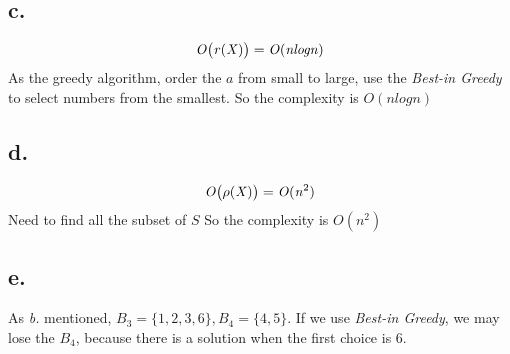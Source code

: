 \documentclass{article}
\begin{document}
{    \subsection*{c.}{
        \[\mathit{O\big{(}r(X)\big{)}=O(n log n)}\]
        As the greedy algorithm, order the \(\mathit{a}\) from small to large, use the \textit{Best-in Greedy} to select numbers from the smallest. So the complexity is \(\mathit{O(n log n)}\)
    }
    \subsection*{d.}{
        \[\mathit{O\big{(}\rho(X)\big{)}=O(n^{\mathrm{2}})}\]
        Need to find all the subset of \(\mathit{S}\) So the complexity is \(\mathit{O(n^2)}\)
    }
    \subsection*{e.}{
        As \textit{b.} mentioned, \(\mathit{B}_{\mathrm{3}}=\mathrm{\{1,2,3,6\}},\mathit{B}_{\mathrm{4}}=\mathrm{\{4,5\}}\). If we use \textit{Best-in Greedy}, we may lose the \(\mathit{B_4}\), because there is a solution when the first choice is 6. 
    }
}
\end{document}
